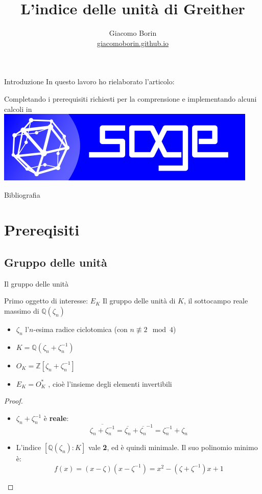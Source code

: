 \documentclass[handout]{beamer}
\title{L’indice delle unità di Greither}
\author{Giacomo Borin\\ \href{giacomoborin.github.io}{giacomoborin.github.io}}
\institute{Dipartimento di Matematica}
\newcommand{\mybibexclude}[1]{\addtocategory{fullcited}{#1}}
\theoremstyle{plain}
\theoremstyle{remark}
\theoremstyle{definition}
\newcommand{\sage}{\href{https://www.sagemath.org}{\includegraphics[height=\fontcharht\font`\B]{../images/sage.png} }}
\newcommand{\noqed}{\let\qed\relax}
\newcommand{\Z}{\mathbb{Z}}
\newcommand{\Q}{\mathbb{Q}}
\begin{document}
	\begin{frame}[plain]
	    \maketitle
	\end{frame}
	
	\begin{frame}{Introduzione}
		In questo lavoro ho rielaborato l'articolo:
		\begin{exampleblock}{}
			 \mybibexclude{GRE}
		\end{exampleblock}	
		\pause
		Completando i prerequisiti richiesti per la comprensione e implementando alcuni calcoli in \sage
	\end{frame}
	
	\begin{frame}[allowframebreaks]{Bibliografia}
			\printbibliography[heading=none, notcategory=fullcited]
	\end{frame}
	

	
\section{Prereqisiti}
\subsection{Gruppo delle unità}
	\begin{frame}{Il gruppo delle unità}
		\begin{block}{Primo oggetto di interesse: $ E_K $}
			Il gruppo delle unità di $ K $, il sottocampo reale massimo di $ \Q (\zeta_n )  $
		\end{block}
		\pause
		\begin{itemize}
			\item $ \zeta_n $  l'$ n $-esima radice ciclotomica (con $ n \not \equiv 2 \mod 4 $) \pause
			\item $ K = \Q (\zeta_n + \zeta_n^{-1})$ \pause
			\item $ O_K = \Z[\zeta_n + \zeta_n^{-1}] $ \pause
			\item $ E_K = O _K ^\ast$ , cioè l'insieme degli elementi invertibili 
		\end{itemize}
		\hyperlink{skip1}{ }
	\end{frame}
	
	\begin{frame}
		\begin{proof} \noqed
			\begin{itemize}
			\item $  \zeta_n + \zeta_n^{-1}  $ è \textbf{reale}:
			\[ \overline{\zeta_n + \zeta_n^{-1}} = \overline{\zeta_n} + \overline{\zeta_n}^{-1} = \zeta_n^{-1} + \zeta_n \] \pause
			\item L'indice $ [\Q(\zeta_n) : K] $ vale \textbf{2}, ed è quindi minimale. \pause 
			Il suo polinomio minimo è: 
			\[ f(x) = (x-\zeta)(x- \zeta^{-1}) = x^2 - (\zeta + \zeta ^{-1})x +1   \]
			\end{itemize}
		\end{proof}
	\end{frame}
	
\end{document}

